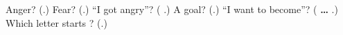 \begin{tcolorbox}[breakable,colback=teal!4,colframe=teal!35!black,title={Before you move on}]
Anger? (\textbf{}.) Fear? (\textbf{}.) \textquotedblleft{}I got angry\textquotedblright{}? (\textbf{  }.) A goal? (\textbf{}.) \textquotedblleft{}I want to become\textquotedblright{}? (\textbf{ …  }.) Which letter starts \textbf{}? (\textbf{}.)
\end{tcolorbox}

